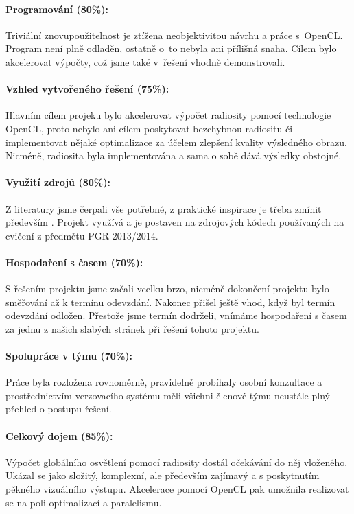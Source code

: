 \documentclass[11pt,a4paper]{article}
\begin{document}
\paragraph{Programování (80\%):}
Triviální znovupoužitelnost je ztížena neobjektivitou návrhu a práce s~OpenCL. Program není plně odladěn, ostatně o~to nebyla ani přílišná snaha. Cílem bylo akcelerovat výpočty, což jsme také v~řešení vhodně demonstrovali. 

\paragraph{Vzhled vytvořeného řešení (75\%):}
Hlavním cílem projeku bylo akcelerovat výpočet radiosity pomocí technologie OpenCL, proto nebylo ani cílem poskytovat bezchybnou radiositu či implementovat nějaké optimalizace za účelem zlepšení kvality výsledného obrazu. Nicméně, radiosita byla implementována a sama o sobě dává výsledky obstojné.

\paragraph{Využití zdrojů (80\%):}
Z literatury jsme čerpali vše potřebné, z praktické inspirace je třeba zmínit především \cite{sabata}. Projekt využívá a je postaven na zdrojových kódech používaných na cvičení z předmětu PGR 2013/2014.

\paragraph{Hospodaření s časem (70\%):}
S řešením projektu jsme začali vcelku brzo, nicméně dokončení projektu bylo směřování až k termínu odevzdání. Nakonec přišel ještě vhod, když byl termín odevzdání odložen. Přestože jsme termín dodrželi, vnímáme hospodaření s časem za jednu z našich slabých stránek při řešení tohoto projektu.

\paragraph{Spolupráce v týmu (70\%):}
Práce byla rozložena rovnoměrně, pravidelně probíhaly osobní konzultace a prostřednictvím verzovacího systému měli všichni členové týmu neustále plný přehled o postupu řešení.

\paragraph{Celkový dojem (85\%):}
Výpočet globálního osvětlení pomocí radiosity dostál očekávání do něj vloženého. Ukázal se jako složitý, komplexní, ale především zajímavý a s poskytnutím pěkného vizuálního výstupu. Akcelerace pomocí OpenCL pak umožnila realizovat se na poli optimalizací a paralelismu.
\end{document}
